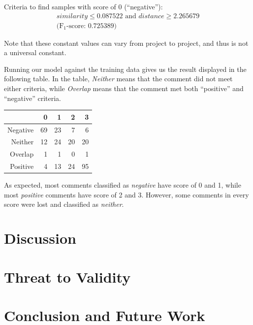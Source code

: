 \documentclass[conference]{IEEEtran}
\begin{document}
Criteria to find samples with score of 0 (``negative''):
\begin{gather*} similarity \leq 0.087522 \text{ and } distance \geq 2.265679
\\ \text{(F$_1$-score: 0.725389)}\end{gather*}

Note that these constant values can vary from project to project, and thus is not a universal constant.


Running our model against the training data gives us the result displayed in the following table.
In the table, \emph{Neither} means that the comment did not meet either criteria, while \emph{Overlap} means that the comment  met both ``positive'' and ``negative'' criteria.

\begin{center}
\begin{tabular}{|r|rrrr|}
\hline
& \bfseries 0 & \bfseries 1 & \bfseries 2 & \bfseries 3 \\
\hline
Negative & 69 & 23 & 7 & 6 \\
Neither & 12 & 24 & 20 & 20 \\
Overlap & 1 & 1 & 0 & 1 \\
Positive & 4 & 13 & 24 & 95 \\
\hline
\end{tabular}
\end{center}

As expected, most comments classified as \emph{negative} have score of 0 and 1,
while most \emph{positive} comments have score of 2 and 3.
However, some comments in every score were lost and classified as \emph{neither}.



\section{Discussion}





\section{Threat to Validity}


\section{Conclusion and Future Work}


\IEEEpeerreviewmaketitle







\end{document}

